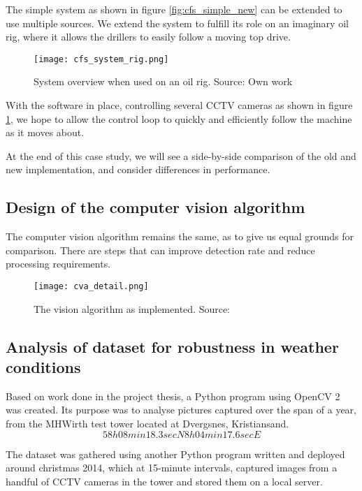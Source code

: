The simple system as shown in figure \ref{fig:cfs_simple_new} can be extended to use multiple sources. We extend the system to fulfill its role on an imaginary oil rig, where it allows the drillers to easily follow a moving top drive.

\begin{figure}[ht]
    \centering
    \texttt{[image: cfs\_system\_rig.png]}
    \caption{System overview when used on an oil rig. Source: Own work}
    \label{fig:cfs_system_rig}
\end{figure}
\FloatBarrier

With the software in place, controlling several CCTV cameras as shown in figure \ref{fig:cfs_system_rig}, we hope to allow the control loop to quickly and efficiently follow the machine as it moves about. 

At the end of this case study, we will see a side-by-side comparison of the old and new implementation, and consider differences in performance.

\subsection{Design of the computer vision algorithm}
The computer vision algorithm remains the same, as to give us equal grounds for comparison. There are steps that can improve detection rate and reduce processing requirements.

\begin{figure}[ht]
    \centering
    \texttt{[image: cva\_detail.png]}
    \caption{The vision algorithm as implemented. Source:\citet{joakimsk14}}
    \label{fig:}
\end{figure}
\FloatBarrier

\subsection{Analysis of dataset for robustness in weather conditions}
Based on work done in the project thesis, a Python program using OpenCV 2 was created. Its purpose was to analyse pictures captured over the span of a year, from the MHWirth test tower located at Dvergsnes, Kristiansand.
\begin{equation}
58h 08min 18.3sec N 8h 04min 17.6sec E
\end{equation}

The dataset was gathered using another Python program written and deployed around christmas 2014, which at 15-minute intervals, captured images from a handful of CCTV cameras in the tower and stored them on a local server.

